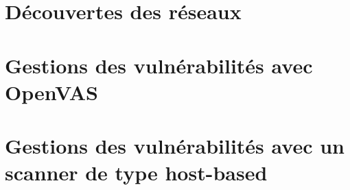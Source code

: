 \part{Découvertes des réseaux}





\newpage
\part{Gestions des vulnérabilités avec OpenVAS}





\newpage
\setcounter{part}{3}
\part{Gestions des vulnérabilités avec un scanner de type host-based}
